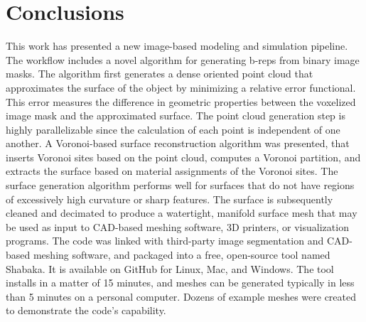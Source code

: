 \chapter{Conclusions}
\label{chap:7}
%

This work has presented a new image-based modeling and simulation pipeline. The workflow includes a novel algorithm for generating b-reps from binary image masks. The algorithm first generates a dense oriented point cloud that approximates the surface of the object by minimizing a relative error functional. This error measures the difference in geometric properties between the voxelized image mask and the approximated surface. The point cloud generation step is highly parallelizable since the calculation of each point is independent of one another. A Voronoi-based surface reconstruction algorithm was presented, that inserts Voronoi sites based on the point cloud, computes a Voronoi partition, and extracts the surface based on material assignments of the Voronoi sites. The surface generation algorithm performs well for surfaces that do not have regions of excessively high curvature or sharp features. The surface is subsequently cleaned and decimated to produce a watertight, manifold surface mesh that may be used as input to CAD-based meshing software, 3D printers, or visualization programs. The code was linked with third-party image segmentation and CAD-based meshing software, and packaged into a free, open-source tool named Shabaka. It is available on GitHub for Linux, Mac, and Windows. The tool installs in a matter of 15 minutes, and meshes can be generated typically in less than 5 minutes on a personal computer. Dozens of example meshes were created to demonstrate the code's capability.

